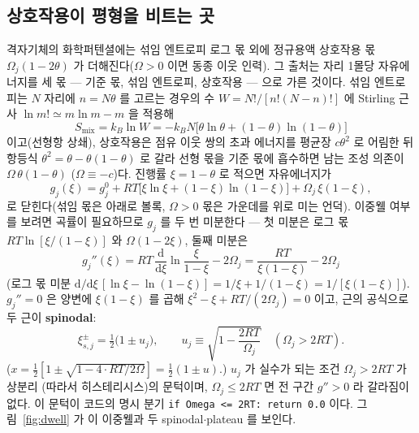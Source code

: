 \documentclass[11pt,a4paper]{article}
\newcommand{\dd}{\mathrm{d}}
\newcommand{\code}[1]{\texttt{#1}}
\begin{document}
\subsection{상호작용이 평형을 비트는 곳}
격자기체의 화학퍼텐셜에는 섞임 엔트로피 로그 몫 외에 정규용액 상호작용 몫 $\Omega_j(1-2\theta)$ 가 더해진다($\Omega>0$
이면 동종 이웃 인력). 그 출처는 자리 1몰당 자유에너지를 세 몫 --- 기준 몫, 섞임 엔트로피, 상호작용 --- 으로 가른 것이다.
섞임 엔트로피는 $N$ 자리에 $n=N\theta$ 를 고르는 경우의 수 $W=N!/[n!(N-n)!]$ 에 Stirling 근사 $\ln m!\simeq m\ln m-m$ 을
적용해
\begin{equation}
S_\mathrm{mix}=k_B\ln W=-k_BN\big[\theta\ln\theta+(1-\theta)\ln(1-\theta)\big]
\label{eq:smix}
\end{equation}
이고(선형항 상쇄), 상호작용은 점유 이웃 쌍의 초과 에너지를 평균장 $c\theta^2$ 로 어림한 뒤 항등식
$\theta^2=\theta-\theta(1-\theta)$ 로 갈라 선형 몫을 기준 몫에 흡수하면 남는 조성 의존이 $\Omega\,\theta(1-\theta)$
($\Omega\equiv-c$)다. 진행률 $\xi=1-\theta$ 로 적으면 자유에너지가
\begin{equation}
g_j(\xi)=g_j^0+RT\big[\xi\ln\xi+(1-\xi)\ln(1-\xi)\big]+\Omega_j\,\xi(1-\xi),
\label{eq:gxi}
\end{equation}
로 닫힌다(섞임 몫은 아래로 볼록, $\Omega>0$ 몫은 가운데를 위로 미는 언덕). 이중웰 여부를 보려면 곡률이 필요하므로
$g_j$ 를 두 번 미분한다 --- 첫 미분은 로그 몫 $RT\ln[\xi/(1-\xi)]$ 와 $\Omega(1-2\xi)$, 둘째 미분은
\begin{equation}
g_j''(\xi)=RT\,\frac{\dd}{\dd\xi}\ln\frac{\xi}{1-\xi}-2\Omega_j
=\frac{RT}{\xi(1-\xi)}-2\Omega_j
\label{eq:gpp}
\end{equation}
(로그 몫 미분 $\dd/\dd\xi\,[\ln\xi-\ln(1-\xi)]=1/\xi+1/(1-\xi)=1/[\xi(1-\xi)]$). $g_j''=0$ 은 양변에 $\xi(1-\xi)$ 를
곱해 $\xi^2-\xi+RT/(2\Omega_j)=0$ 이고, 근의 공식으로 두 근이 \textbf{spinodal}:
\begin{equation}
\xi_{s,j}^\pm=\tfrac12\big(1\pm u_j\big),\qquad
u_j\equiv\sqrt{1-\frac{2RT}{\Omega_j}}\quad(\Omega_j>2RT).
\label{eq:spinodal}
\end{equation}
($x=\tfrac12[1\pm\sqrt{1-4\cdot RT/2\Omega}]=\tfrac12(1\pm u)$.) $u_j$ 가 실수가 되는 조건 $\Omega_j>2RT$ 가 상분리
(따라서 히스테리시스)의 문턱이며, $\Omega_j\le2RT$ 면 전 구간 $g''>0$ 라 갈라짐이 없다. 이 문턱이 코드의 명시 분기
\code{if Omega <= 2RT: return 0.0} 이다. 그림~\ref{fig:dwell} 가 이 이중웰과 두 spinodal$\cdot$plateau 를 보인다.
\end{document}
